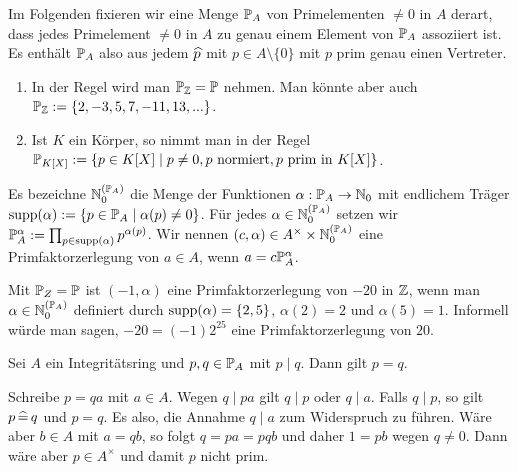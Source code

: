 \documentclass[../../main.tex]{subfiles}
\begin{document}
\begin{nt}\label{16.4.8}
Im Folgenden fixieren wir eine Menge $\P_A$ von Primelementen $\neq 0$ in $A$ derart, dass jedes Primelement $\neq 0$ in $A$ zu genau einem Element von $\P_A$ assoziiert ist. Es enthält $\P_A$ also aus jedem $\tc p$ mit $p\in A\setminus\{0\}$ mit $p$ prim genau einen Vertreter.
\end{nt}

\begin{bsp}\label{14.4.9}
\begin{enumerate}[\normalfont(a)]
\item In der Regel wird man $\P_\Z=\P$ nehmen. Man könnte aber auch $\P_\Z:=\{2,-3,5,7,-11,13,...\}$.
\item Ist $K$ ein Körper, so nimmt man in der Regel\\
$\P_{K[X]}:=\{p\in K[X]\mid p\neq 0, p\text{ normiert},p\text{ prim in }K[X]\}$.
\end{enumerate}
\end{bsp}

\begin{df}\label{14.4.10}
Es bezeichne $\N_0^{(\P_A)}$ die Menge der Funktionen $\alpha: \P_A\to \N_0$ mit endlichem Träger $\supp(\alpha):=\{p\in \P_A\mid \alpha(p)\neq 0\}$. Für jedes $\alpha\in\N_0^{(\P_A)}$ setzen wir $\P_A ^\alpha:=\prod_{p\in\supp(\alpha)}p^{\alpha(p)}$. Wir nennen $(c,\alpha)\in A^\times\times \N_0^{(\P_A)}$ eine Primfaktorzerlegung von $a\in A$, wenn $a=c\P_A^\alpha$.
\end{df}

\begin{bsp}\label{14.4.11}
Mit $\P_Z=\P$ ist $(-1,\alpha)$ eine Primfaktorzerlegung von $-20$ in $\Z$, wenn man $\alpha\in \N_0^{(\P_A)}$ definiert durch $\supp(\alpha)=\{2,5\}$, $\alpha(2)=2$ und $\alpha(5)=1$. Informell würde man sagen, $-20=(-1)2^25$ eine Primfaktorzerlegung von $20$.
\end{bsp}

\begin{lem}\label{16.4.12}
Sei $A$ ein Integritätsring und $p,q\in \P_A$ mit $p\mid q$. Dann gilt $p=q$.
\end{lem}
\begin{cproof}
Schreibe $p=qa$ mit $a\in A$. Wegen $q\mid pa$ gilt $q\mid p$ oder $q\mid a$. Falls $q\mid p$, so gilt $p\divi q$ und $p=q$. Es also, die Annahme $q\mid a$ zum Widerspruch zu führen.  Wäre aber $b\in A$ mit $a=qb$, so folgt $q=pa=pqb$ und daher $1=pb$ wegen $q\neq 0$. Dann wäre aber $p\in A^\times$ und damit $p$ nicht prim.
\end{cproof}
\end{document}
